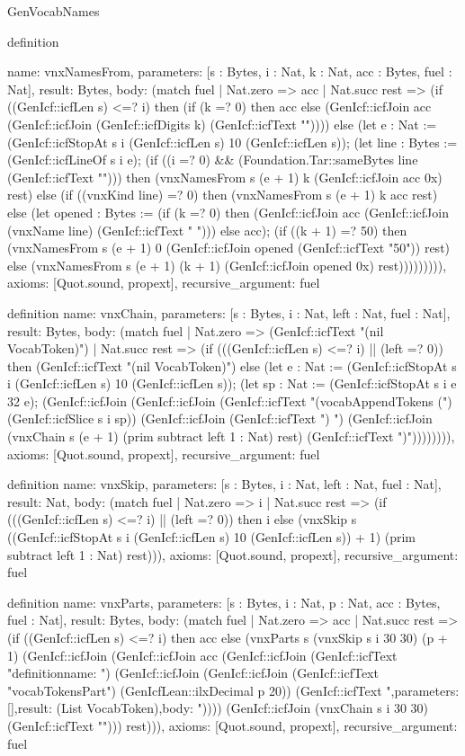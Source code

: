 \begin{lexlean}{GenVocabNames}
\begin{semanticmodule}
{{definition{
  name: vnxNamesFrom,
  parameters: [s : Bytes, i : Nat, k : Nat, acc : Bytes, fuel : Nat],
  result: Bytes,
  body: (match fuel
    | Nat.zero => acc
    | Nat.succ rest => (if ((GenIcf::icfLen s) <=? i) then (if (k =? 0) then acc else (GenIcf::icfJoin acc (GenIcf::icfJoin (GenIcf::icfDigits k) (GenIcf::icfText "\n")))) else (let e : Nat := (GenIcf::icfStopAt s i (GenIcf::icfLen s) 10 (GenIcf::icfLen s)); (let line : Bytes := (GenIcf::icfLineOf s i e); (if ((i =? 0) && (Foundation.Tar::sameBytes line (GenIcf::icfText "{"))) then (vnxNamesFrom s (e + 1) k (GenIcf::icfJoin acc 0x) rest) else (if ((vnxKind line) =? 0) then (vnxNamesFrom s (e + 1) k acc rest) else (let opened : Bytes := (if (k =? 0) then (GenIcf::icfJoin acc (GenIcf::icfJoin (vnxName line) (GenIcf::icfText " "))) else acc); (if ((k + 1) =? 50) then (vnxNamesFrom s (e + 1) 0 (GenIcf::icfJoin opened (GenIcf::icfText "50\n")) rest) else (vnxNamesFrom s (e + 1) (k + 1) (GenIcf::icfJoin opened 0x) rest))))))))),
  axioms: [Quot.sound, propext],
  recursive_argument: fuel
}

definition{
  name: vnxChain,
  parameters: [s : Bytes, i : Nat, left : Nat, fuel : Nat],
  result: Bytes,
  body: (match fuel
    | Nat.zero => (GenIcf::icfText "(nil VocabToken)")
    | Nat.succ rest => (if (((GenIcf::icfLen s) <=? i) || (left =? 0)) then (GenIcf::icfText "(nil VocabToken)") else (let e : Nat := (GenIcf::icfStopAt s i (GenIcf::icfLen s) 10 (GenIcf::icfLen s)); (let sp : Nat := (GenIcf::icfStopAt s i e 32 e); (GenIcf::icfJoin (GenIcf::icfJoin (GenIcf::icfText "(vocabAppendTokens (") (GenIcf::icfSlice s i sp)) (GenIcf::icfJoin (GenIcf::icfText ") ") (GenIcf::icfJoin (vnxChain s (e + 1) (prim subtract left 1 : Nat) rest) (GenIcf::icfText ")")))))))),
  axioms: [Quot.sound, propext],
  recursive_argument: fuel
}

definition{
  name: vnxSkip,
  parameters: [s : Bytes, i : Nat, left : Nat, fuel : Nat],
  result: Nat,
  body: (match fuel
    | Nat.zero => i
    | Nat.succ rest => (if (((GenIcf::icfLen s) <=? i) || (left =? 0)) then i else (vnxSkip s ((GenIcf::icfStopAt s i (GenIcf::icfLen s) 10 (GenIcf::icfLen s)) + 1) (prim subtract left 1 : Nat) rest))),
  axioms: [Quot.sound, propext],
  recursive_argument: fuel
}

definition{
  name: vnxParts,
  parameters: [s : Bytes, i : Nat, p : Nat, acc : Bytes, fuel : Nat],
  result: Bytes,
  body: (match fuel
    | Nat.zero => acc
    | Nat.succ rest => (if ((GenIcf::icfLen s) <=? i) then acc else (vnxParts s (vnxSkip s i 30 30) (p + 1) (GenIcf::icfJoin (GenIcf::icfJoin acc (GenIcf::icfJoin (GenIcf::icfText "definition{\n  name: ") (GenIcf::icfJoin (GenIcf::icfJoin (GenIcf::icfText "vocabTokensPart") (GenIcfLean::ilxDecimal p 20)) (GenIcf::icfText ",\n  parameters: [],\n  result: (List VocabToken),\n  body: ")))) (GenIcf::icfJoin (vnxChain s i 30 30) (GenIcf::icfText "\n}\n\n"))) rest))),
  axioms: [Quot.sound, propext],
  recursive_argument: fuel
}

}}}
\end{semanticmodule}
\end{lexlean}
